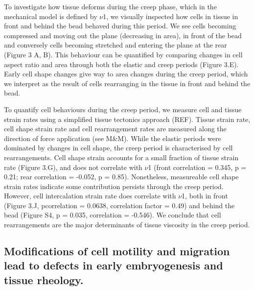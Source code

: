 To investigate how tissue deforms during the creep phase, which in the mechanical model is defined by $\nu$1, we visually inspected how cells in tissue in front and behind the bead behaved during this period.
We see cells becoming compressed and moving out the plane (decreasing in area), in front of the bead and conversely cells becoming stretched and entering the plane at the rear (Figure 3 A, B).
This behaviour can be quantified by comparing changes in cell aspect ratio and area through both the elastic and creep periods (Figure 3.E).
Early cell shape changes give way to area changes during the creep period, which we interpret as the result of cells rearranging in the tissue in front and behind the bead.

To quantify cell behaviours during the creep period, we measure cell and tissue strain rates using a simplified tissue tectonics approach (REF).
Tissue strain rate, cell shape strain rate and cell rearrangement rates are measured along the direction of force application (see M\&M).
While the elastic periods were dominated by changes in cell shape, the creep period is characterised by cell rearrangements.
Cell shape strain accounts for a small fraction of tissue strain rate (Figure 3.G), and does not correlate with $\nu$1 (front correlation = 0.345, p = 0.21; rear correlation = -0.052, p = 0.85).
Nonetheless, measureable cell shape strain rates indicate some contribution persists through the creep period.
However, cell intercalation strain rate does correlate with $\nu$1, both in front (Figure 3.J, pcorrelation = 0.0638, correlation factor = 0.49) and behind the bead (Figure S4, p = 0.035, correlation = -0.546).
We conclude that cell rearrangements are the major determinants of tissue viscosity in the creep period.

\subsection{Modifications of cell motility and migration lead to defects in early embryogenesis and tissue rheology.}

